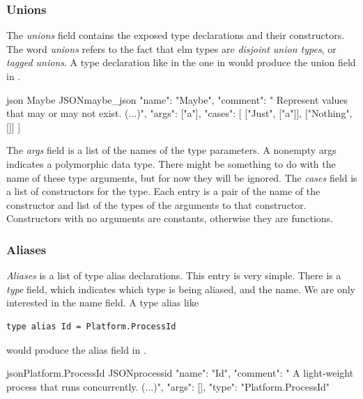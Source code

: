 \documentclass[../thesis.tex]{subfiles}
\begin{document}
\subsubsection{Unions}\label{unions}
The \textit{unions} field contains the exposed type declarations and their constructors.
The word \textit{unions} refers to the fact that elm types are \textit{disjoint union types}, or \textit{tagged unions}.
A type declaration like in the one in  would produce the union field in .
\begin{code}{ json }{Maybe JSON}{maybe_json}
{
  "name": "Maybe",
  "comment": " Represent values that may or may not exist. (...)",
  "args": ["a"],
  "cases": [
    ["Just", ["a"]],
    ["Nothing", []]
  ]
}
\end{code}
The \textit{args} field is a list of the names of the type parameters.
A nonempty args indicates a polymorphic data type.
There might be something to do with the name of these type arguments, but for now they will be ignored.
The \textit{cases} field is a list of constructors for the type.
Each entry is a pair of the name of the constructor and list of the types of the arguments to that constructor.
Constructors with no arguments are constants, otherwise they are functions.

\subsubsection{Aliases}\label{aliases}
\textit{Aliases} is a list of type alias declarations.
This entry is very simple.
There is a \textit{type} field, which indicates which type is being aliased, and the name.
We are only interested in the name field.
A type alias like
\begin{verbatim}
type alias Id = Platform.ProcessId
\end{verbatim}
would produce the alias field in .
\begin{code}{json}{Platform.ProcessId JSON}{processid}
{
  "name": "Id",
  "comment": " A light-weight process that runs concurrently. (...)",
  "args": [],
  "type": "Platform.ProcessId"
}
\end{code}
\end{document}
